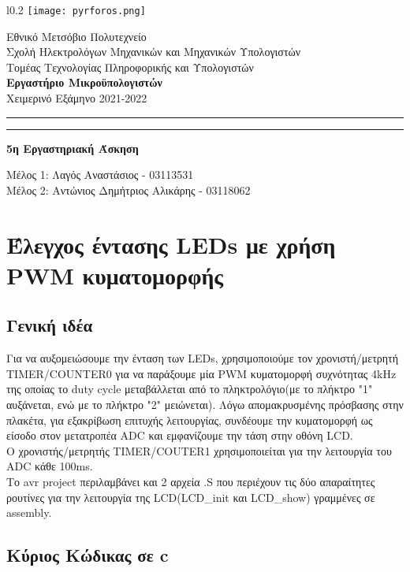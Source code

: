 \documentclass{article}
\begin{document}
\begin{wrapfigure}[5]{l}{0.2\textwidth}
\texttt{[image: pyrforos.png]}
\end{wrapfigure} 
\noindent
Εθνικό Μετσόβιο Πολυτεχνείο\\
Σχολή Ηλεκτρολόγων Μηχανικών και Μηχανικών Υπολογιστών\\
Τομέας Τεχνολογίας Πληροφορικής και Υπολογιστών\\
\textbf{Εργαστήριο Μικροϋπολογιστών}\\
Χειμερινό Εξάμηνο 2021-2022\\
\vspace{2.5cm}
\vspace{-5em}
\hrule \vspace{.2em}
\hrule
\vspace{1cm}
\centering
{\Large \textbf{5η Εργαστηριακή Άσκηση}\\}
\vspace{0.2cm}
\raggedright
$~~~~$\\
Μέλος 1: Λαγός Αναστάσιος - 03113531\\
Μέλος 2: Αντώνιος Δημήτριος Αλικάρης - 03118062 \\

\section*{Έλεγχος έντασης LEDs με χρήση PWM κυματομορφής}

\subsection*{Γενική ιδέα}
Για να αυξομειώσουμε την ένταση των LEDs, χρησιμοποιούμε τον χρονιστή/μετρητή TIMER/COUNTER0 για να παράξουμε μία PWM κυματομορφή συχνότητας 4kHz της οποίας το duty cycle μεταβάλλεται από το πληκτρολόγιο(με το πλήκτρο "1" αυξάνεται, ενώ με το πλήκτρο "2" μειώνεται). Λόγω απομακρυσμένης πρόσβασης στην πλακέτα, για εξακρίβωση επιτυχής λειτουργίας, συνδέουμε την κυματομορφή ως είσοδο στον μετατροπέα ADC και εμφανίζουμε την τάση στην οθόνη LCD.\\
Ο χρονιστής/μετρητής TIMER/COUTER1 χρησιμοποιείται για την λειτουργία του ADC κάθε 100ms.\\
Το avr project περιλαμβάνει και 2 αρχεία .S που περιέχουν τις δύο απαραίτητες ρουτίνες για την λειτουργία της LCD(LCD\_init και LCD\_show) γραμμένες σε assembly.

\subsection*{Κύριος Κώδικας σε c}
\end{document}
